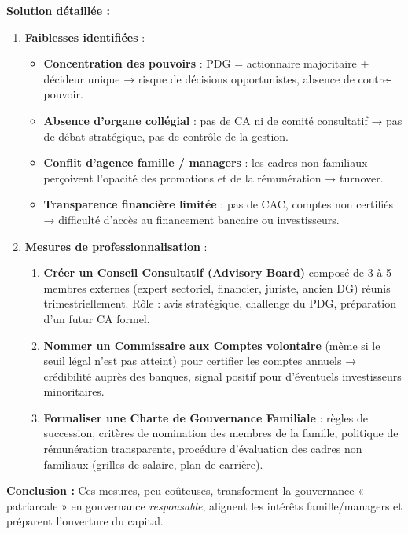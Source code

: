 \documentclass[11pt]{article}
\begin{document}
\begin{exoresolu}
\tcblower
\textbf{Solution détaillée :}
\begin{enumerate}
    \item \textbf{Faiblesses identifiées} :
    \begin{itemize}
        \item \textbf{Concentration des pouvoirs} : PDG = actionnaire majoritaire + décideur unique → risque de décisions opportunistes, absence de contre-pouvoir.
        \item \textbf{Absence d'organe collégial} : pas de CA ni de comité consultatif → pas de débat stratégique, pas de contrôle de la gestion.
        \item \textbf{Conflit d'agence famille / managers} : les cadres non familiaux perçoivent l'opacité des promotions et de la rémunération → turnover.
        \item \textbf{Transparence financière limitée} : pas de CAC, comptes non certifiés → difficulté d'accès au financement bancaire ou investisseurs.
    \end{itemize}
    \item \textbf{Mesures de professionnalisation} :
    \begin{enumerate}
        \item \textbf{Créer un Conseil Consultatif (Advisory Board)} composé de 3 à 5 membres externes (expert sectoriel, financier, juriste, ancien DG) réunis trimestriellement. Rôle : avis stratégique, challenge du PDG, préparation d'un futur CA formel.
        \item \textbf{Nommer un Commissaire aux Comptes volontaire} (même si le seuil légal n'est pas atteint) pour certifier les comptes annuels → crédibilité auprès des banques, signal positif pour d'éventuels investisseurs minoritaires.
        \item \textbf{Formaliser une Charte de Gouvernance Familiale} : règles de succession, critères de nomination des membres de la famille, politique de rémunération transparente, procédure d'évaluation des cadres non familiaux (grilles de salaire, plan de carrière).
    \end{enumerate}
\end{enumerate}
\textbf{Conclusion :} Ces mesures, peu coûteuses, transforment la gouvernance « patriarcale » en gouvernance \emph{responsable}, alignent les intérêts famille/managers et préparent l'ouverture du capital.
\end{exoresolu}
\end{document}

